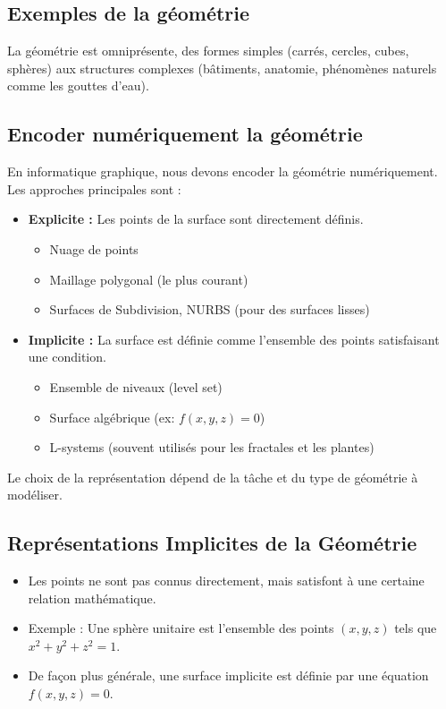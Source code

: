 \documentclass{article}
\begin{document}
\subsection{Exemples de la géométrie}
La géométrie est omniprésente, des formes simples (carrés, cercles, cubes, sphères) aux structures complexes (bâtiments, anatomie, phénomènes naturels comme les gouttes d'eau).

\subsection{Encoder numériquement la géométrie}

En informatique graphique, nous devons encoder la géométrie numériquement. Les approches principales sont :

\begin{itemize}
    \item \textbf{Explicite :} Les points de la surface sont directement définis.
        \begin{itemize}
            \item Nuage de points
            \item Maillage polygonal (le plus courant)
            \item Surfaces de Subdivision, NURBS (pour des surfaces lisses)
        \end{itemize}
    \item \textbf{Implicite :} La surface est définie comme l'ensemble des points satisfaisant une condition.
        \begin{itemize}
            \item Ensemble de niveaux (level set)
            \item Surface algébrique (ex: $f(x,y,z)=0$)
            \item L-systems (souvent utilisés pour les fractales et les plantes)
        \end{itemize}
\end{itemize}
Le choix de la représentation dépend de la tâche et du type de géométrie à modéliser.

\subsection{Représentations Implicites de la Géométrie}

\begin{itemize}
    \item Les points ne sont pas connus directement, mais satisfont à une certaine relation mathématique.
    \item Exemple : Une sphère unitaire est l'ensemble des points $(x, y, z)$ tels que $x^2 + y^2 + z^2 = 1$.
    \item De façon plus générale, une surface implicite est définie par une équation $f(x, y, z) = 0$.
\end{itemize}
\end{document}
